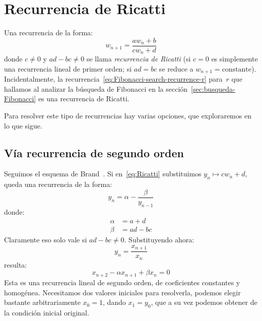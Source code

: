 %

\section{Recurrencia de Ricatti}
\label{sec:Ricatti}

  Una recurrencia de la forma:
  \begin{equation}
    \label{eq:Ricatti}
    w_{n + 1}
      = \frac{a w_n + b}{c w_n + d}
  \end{equation}
  donde \(c \ne 0\)
  y \(a d - b c \ne 0\) se llama \emph{recurrencia de Ricatti}
  (si \(c = 0\) es simplemente una recurrencia lineal de primer orden;
   si \(a d = b c\) se reduce a \(w_{n + 1} = \text{constante}\)).
  Incidentalmente,
  la recurrencia~\eqref{eq:Fibonacci-search-recurrence-r}
  para~\(r\)
  que hallamos al analizar la búsqueda de Fibonacci
  en la sección~\ref{sec:busqueda-Fibonacci}%
  es una recurrencia de Ricatti.

  Para resolver este tipo de recurrencias hay varias opciones,
  que exploraremos en lo que sigue.

\subsection{Vía recurrencia de segundo orden}
\label{sec:Ricatti-2nd}

  Seguimos el esquema de Brand~\cite{brand55:_seq_def_difference_eq}.
  Si en~\eqref{eq:Ricatti} substituimos \(y_n \mapsto c w_n + d\),
  queda una recurrencia de la forma:
  \begin{equation}
    \label{eq:Ricatti-2nd-aux-1}
    y_n
      = \alpha - \frac{\beta}{y_{n - 1}}
  \end{equation}
  donde:
  \begin{align*}
    \alpha
      &= a + d \\
    \beta
      &= a d - b c
  \end{align*}
  Claramente eso solo vale si \(a d - b c \ne 0\).
  Substituyendo ahora:
  \begin{equation}
    \label{eq:Ricatti-2nd-y}
    y_n
      = \frac{x_{n + 1}}{x_n}
  \end{equation}
  resulta:
  \begin{equation}
    \label{eq:Ricatti-2nd-aux}
    x_{n + 2} - \alpha x_{n + 1} + \beta x_n
      = 0
  \end{equation}
  Esta es una recurrencia lineal de segundo orden,
  de coeficientes constantes y homogénea.
  Necesitamos dos valores iniciales para resolverla,
  podemos elegir bastante arbitrariamente \(x_0 = 1\),
  dando \(x_1 = y_0\),
  que a su vez podemos obtener de la condición inicial original.

